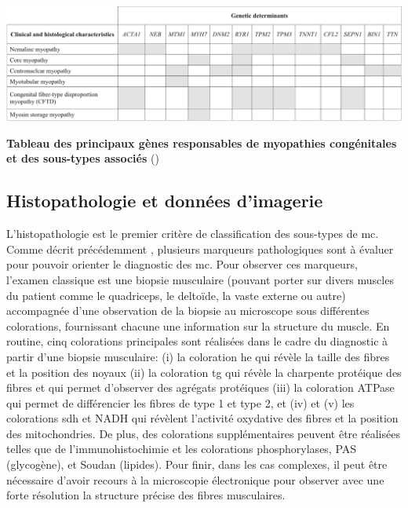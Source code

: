 \begin{table}[!ht]
\centering
\includegraphics[width=1\textwidth]{figures/gene_tab.png}
\caption[Tableau des principaux gènes responsables de myopathies congénitales et des sous-types associés]{\textbf{Tableau des principaux gènes responsables de myopathies congénitales et des sous-types associés} (\cite{cassandrini_congenital_2017})}
\label{tab:gene_myo}
\end{table}
\subsection{Histopathologie et données d'imagerie }
L'histopathologie est le premier critère de classification des sous-types de \gls{mc}. Comme décrit précédemment , plusieurs marqueurs pathologiques sont à évaluer pour pouvoir orienter le diagnostic des \gls{mc}. Pour observer ces marqueurs, l'examen classique est une biopsie musculaire (pouvant porter sur divers muscles du patient comme le quadriceps, le deltoïde, la vaste externe ou autre) accompagnée d'une observation de la biopsie au microscope sous différentes colorations, fournissant chacune une information sur la structure du muscle. En routine, cinq colorations principales sont réalisées dans le cadre du diagnostic à partir d'une biopsie musculaire: (i) la coloration \gls{he} qui révèle la taille des fibres et la position des noyaux (ii) la coloration \gls{tg} qui révèle la charpente protéique des fibres et qui permet d'observer des agrégats protéiques (iii) la coloration ATPase qui permet de différencier les fibres de type 1 et type 2, et (iv) et (v) les colorations \gls{sdh} et NADH qui révèlent l'activité oxydative des fibres et la position des mitochondries. De plus, des colorations supplémentaires peuvent être réalisées telles que de l'immunohistochimie et les colorations phosphorylases, PAS (glycogène), et Soudan (lipides). Pour finir, dans les cas complexes, il peut être nécessaire d'avoir recours à la microscopie électronique pour observer avec une forte résolution la structure précise des fibres musculaires.

